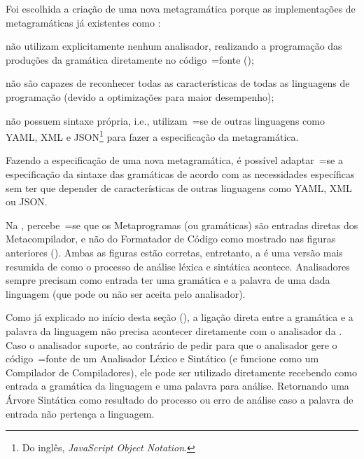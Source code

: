 Foi escolhida a criação de uma nova metagramática porque as implementações de metagramáticas já existentes como :
\begin{inparaenum}[1)]
\item não utilizam explicitamente nenhum analisador,
realizando a programação das produções da gramática diretamente no código~=fonte ();
\item não são capazes de reconhecer todas as características de todas as linguagens de programação (devido a optimizações para maior desempenho);
\item não possuem sintaxe própria,
i.e.,
utilizam~=se de outras linguagens como YAML,
XML e JSON\footnote{%
Do inglês,
\textit{JavaScript Object Notation}.
} \cite{foundationsOfJSONSchema} para fazer a especificação da metagramática.
\end{inparaenum}%
Fazendo a especificação de uma nova metagramática,
é possível adaptar~=se a especificação da sintaxe das gramáticas de acordo com as necessidades específicas sem ter que depender de características de outras linguagens como YAML,
XML ou
JSON.

Na ,
percebe~=se que os Metaprogramas (ou gramáticas) são entradas diretas dos Metacompilador,
e não do Formatador de Código como mostrado nas figuras anteriores ().
Ambas as figuras estão corretas,
entretanto,
a  é uma versão mais resumida de como o processo de análise léxica e
sintática acontece.
Analisadores sempre precisam como entrada ter uma gramática e
a palavra de uma dada linguagem (que pode ou
não ser aceita pelo analisador).

Como já explicado no início desta seção (),
a ligação direta entre a gramática e
a palavra da linguagem não precisa acontecer diretamente com o analisador da .
Caso o analisador suporte,
ao contrário de pedir para que o analisador gere o código~=fonte de um Analisador Léxico e
Sintático (e funcione como um Compilador de Compiladores),
ele pode ser utilizado diretamente recebendo como entrada a gramática da linguagem e
uma palavra para análise.
Retornando uma Árvore Sintática como resultado do processo ou
erro de análise caso a palavra de entrada não pertença a linguagem.


